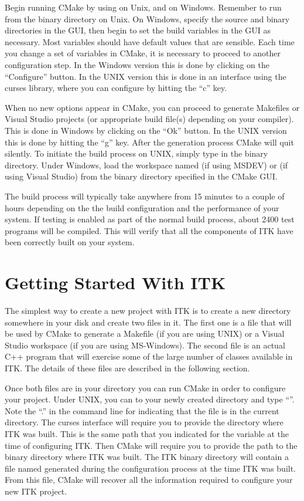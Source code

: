 Begin running CMake by using  on Unix, and  on
Windows.  Remember to run  from the binary directory on Unix. On
Windows, specify the source and binary directories in the GUI, then begin to
set the build variables in the GUI as necessary.  Most variables should have
default values that are sensible. Each time you change a set of variables in
CMake, it is necessary to proceed to another configuration step. In the
Windows version this is done by clicking on the ``Configure'' button. In the
UNIX version this is done in an interface using the curses library, where you
can configure by hitting the ``c'' key.

When no new options appear in CMake, you can proceed to generate Makefiles or
Visual Studio projects (or appropriate build file(s) depending on your
compiler). This is done in Windows by clicking on the ``Ok'' button.  In the
UNIX version this is done by hitting the ``g'' key. After the generation
process CMake will quit silently. To initiate the build process on UNIX,
simply type  in the binary directory. Under Windows, load the
workspace named  (if using MSDEV) or  (if using
Visual Studio) from the binary directory specified in the CMake GUI.

The build process will typically take anywhere from 15 minutes to a couple of
hours depending on the the build configuration and the performance of your
system. If testing is enabled as part of the normal build process,
about 2400 test programs will be compiled. This will verify that all the
components of ITK have been correctly built on your system.


\section{Getting Started With ITK }
\label{sec:GettingStartedWithITK}

The simplest way to create a new project with ITK is to create a new directory
somewhere in your disk and create two files in it. The first one is a
 file that will be used by CMake to generate a Makefile
(if you are using UNIX) or a Visual Studio workspace (if you are using
MS-Windows).  The second file is an actual C++ program that will exercise
some of the large number of classes available in ITK. The details of these files
are described in the following section.

Once both files are in your directory you can run CMake in order to configure
your project. Under UNIX, you can  to your newly created directory
and type ``''. Note the ``.'' in the command line for
indicating that the  file is in the current directory.
The curses interface will require you to provide the directory where ITK was
built. This is the same path that you indicated for the
 variable at the time of configuring ITK. Then CMake
will require you to provide the path to the binary directory where ITK was
built. The ITK binary directory will contain a file named
 generated during the configuration process at the time
ITK was built.  From this file, CMake will recover all the information
required to configure your new ITK project.

